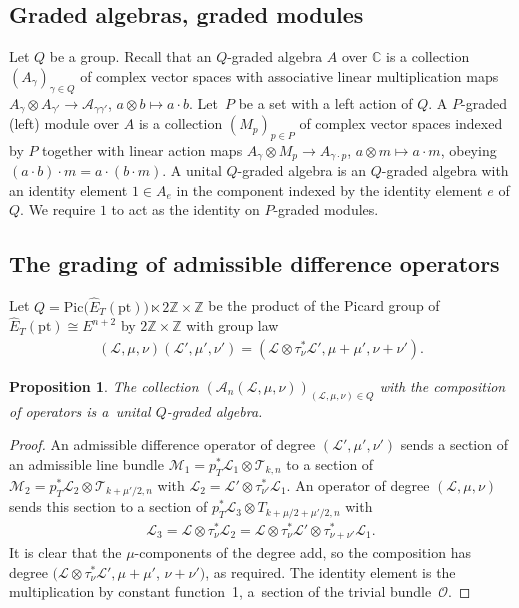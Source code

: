 \documentclass[pdftex]{sigma}
\numberwithin{equation}{section}
\newtheorem{Proposition}[Theorem]{Proposition}
 { \theoremstyle{definition}
\newtheorem{Definition}[Theorem]{Definition}
\newtheorem{Example}[Theorem]{Example}
\newtheorem{Remark}[Theorem]{Remark} }
\begin{document}
\subsection{Graded algebras, graded modules}
Let $Q$ be a group. Recall that an $Q$-graded algebra $A$ over $\mathbb C$ is a collection $(A_\gamma)_{\gamma\in Q}$ of complex vector spaces with associative linear multiplication maps $A_\gamma\otimes A_{\gamma'}\to\mathcal A_{\gamma\gamma'}$, $a\otimes b\mapsto a\cdot b$. Let~$P$ be a set with a left action of $Q$. A $P$-graded (left) module over $A$ is a collection $(M_p)_{p\in P}$ of complex vector spaces indexed by $P$ together with linear action maps $A_\gamma\otimes M_p\to A_{\gamma\cdot p}$, $a\otimes m\mapsto a\cdot m$, obeying $(a\cdot b)\cdot m=a\cdot(b\cdot m)$. A unital $Q$-graded algebra is an $Q$-graded algebra with an identity element $1\in A_e$ in the component indexed by the identity element $e$ of $Q$. We require $1$ to act as the identity on $P$-graded modules.

\subsection{The grading of admissible difference operators}
Let $Q=\mathrm{Pic}\big(\hat E_T(\mathrm{pt})\big)\ltimes 2\mathbb Z\times \mathbb Z$ be the product of the Picard group of $\hat E_T(\mathrm{pt})\cong E^{n+2}$ by $2\mathbb Z\times \mathbb Z$ with group law
\begin{gather*}
 (\mathcal L,\mu,\nu)(\mathcal L',\mu',\nu') =(\mathcal L\otimes \tau^*_\nu \mathcal L', \mu+\mu',\nu+\nu').
\end{gather*}
\begin{Proposition} The collection $(\mathcal A_n(\mathcal L,\mu,\nu))_{(\mathcal L,\mu,\nu)\in Q}$ with the composition of operators is a~unital $Q$-graded algebra.
\end{Proposition}
\begin{proof} An admissible difference operator of degree $(\mathcal L',\mu',\nu')$ sends a section of an admissible line bundle $\mathcal M_1=p_T^*\mathcal L_1\otimes\mathcal T_{k,n}$ to a section of $\mathcal M_2=p_T^*\mathcal L_2\otimes\mathcal T_{k+\mu'/2,n}$ with $\mathcal L_2=\mathcal L'\otimes\tau^*_{\nu'}\mathcal L_1$. An operator of degree $(\mathcal L,\mu,\nu)$ sends this section to a section of $p_T^*\mathcal L_3\otimes T_{k+\mu/2+\mu'/2,n}$ with
 \begin{gather*}
 \mathcal L_3=\mathcal L\otimes \tau^*_{\nu}\mathcal L_2 =\mathcal L\otimes \tau_{\nu}^*\mathcal L'\otimes\tau^*_{\nu+\nu'}\mathcal L_1.
 \end{gather*}
It is clear that the $\mu$-components of the degree add, so the composition has degree $(\mathcal L\otimes\tau_\nu^*\mathcal L',\mu+\mu'$, $\nu+\nu')$, as required. The identity element is the multiplication by constant function~1, a~section of the trivial bundle~$\mathcal O$.
\end{proof}
\end{document}
